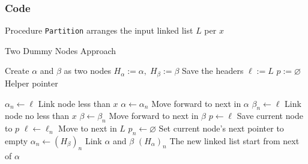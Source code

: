 \subsubsection{Code}
Procedure \texttt{Partition} arranges the input linked list $L$ per $x$
\setcounter{algorithm}{0}
\begin{algorithm}[H]
\caption{Two Dummy Nodes Approach}
\begin{algorithmic}[1]
\State Create $\alpha$ and $\beta$ as two nodes
\State $H_{\alpha}:=\alpha,\; H_{\beta} := \beta$ \Comment Save the headers 
\State $\ell:=L$
\State $p:=\varnothing$ \Comment Helper pointer
\end{algorithmic}
\end{algorithm}
\begin{algorithm}[H]
\begin{algorithmic}[1]
\While{$\ell\neq \varnothing$}
\State $\alpha_n\gets \ell$ \Comment Link node less than $x$
\State $\alpha\gets \alpha_n$ \Comment Move forward to next in $\alpha$
\Else
\State $\beta_n\gets \ell$ \Comment Link node no less than $x$
\State $\beta\gets \beta_n$ \Comment Move forward to next in $\beta$
\EndIf
\State $p\gets \ell$ \Comment Save current node to $p$
\State $\ell\gets \ell_n$ \Comment Move to next in $L$
\State $p_n\gets \varnothing$ \Comment Set current node's next pointer to empty
\EndWhile
\State $\alpha_n \gets (H_{\beta})_n$ \Comment Link $\alpha$ and $\beta$
\State \Return $(H_{\alpha})_n$ \Comment The new linked list start from next of $\alpha$
\EndProcedure
\end{algorithmic}
\end{algorithm}